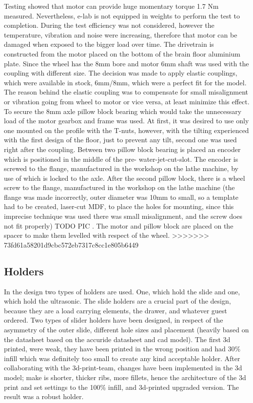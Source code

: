 \documentclass[11pt]{article}
\begin{document}
Testing showed that motor can provide huge momentary torque 1.7 Nm measured. Nevertheless, e-lab is not equipped in weights to perform the test to completion. During the test efficiency was not considered, however the temperature, vibration and noise were increasing, therefore that motor can be damaged when exposed to the bigger load over time.  
The drivetrain is constructed from the motor placed on the bottom of the brain floor aluminium plate. Since the wheel has the 8mm bore and motor 6mm shaft was used with the coupling with different size. The decision was made to apply elastic couplings, which were available in stock, 6mm/8mm, which were a perfect fit for the model. The reason behind the elastic coupling was to compensate for small misalignment or vibration going from wheel to motor or vice versa, at least minimize this effect. To secure the 8mm axle pillow block bearing which would take the unnecessary load of the motor gearbox and frame was used. At first, it was desired to use only one mounted on the profile with the T-nuts, however, with the tilting experienced with the first design of the floor, just to prevent any tilt, second one was used right after the coupling. Between two pillow block bearing is placed an encoder which is positioned in the middle of the pre- water-jet-cut-slot. The encoder is screwed to the flange, manufactured in the workshop on the lathe machine, by use of which is locked to the axle. After the second pillow block, there is a wheel screw to the flange, manufactured in the workshop on the lathe machine (the flange was made incorrectly, outer diameter was 10mm to small, so a template had to be created, laser-cut MDF, to place the holes for mounting, since this imprecise technique was used there was small misalignment, and the screw does not fit properly) TODO PIC . The motor and pillow block are placed on the spacer to make them levelled with respect of the wheel.
>>>>>>> 73fd61a58201d9cbc572eb7317c8cc1e805b6449

\subsection*{Holders}
In the design two types of holders are used. One, which hold the slide and one, which hold the ultrasonic. The slide holders are a crucial part of the design, because they are a load carrying elements, the drawer, and whatever guest ordered. Two types of slider holders have been designed, in respect of the asymmetry of the outer slide, different hole sizes and placement (heavily based on the datasheet based on the accuride datasheet and cad model). The first 3d printed, were weak, they have been printed in the wrong position and had 30\% infill which was definitely too small to create any kind acceptable holder. After collaborating with the 3d-print-team, changes have been implemented in the 3d model; make is shorter, thicker ribs, more fillets, hence the architecture of the 3d print and set settings to the 100\% infill, and 3d-printed upgraded version. The result was a robust holder.
\end{document}
